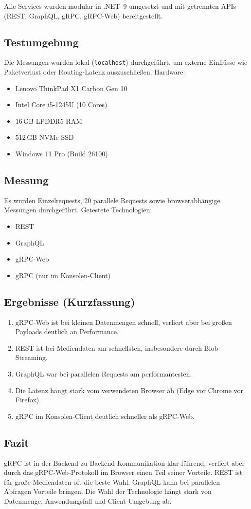Alle Services wurden modular in .NET~9 umgesetzt und mit getrennten APIs (REST, GraphQL, gRPC, gRPC-Web) bereitgestellt.

\subsection{Testumgebung}
Die Messungen wurden lokal (\texttt{localhost}) durchgeführt, um externe Einflüsse wie Paketverlust oder Routing-Latenz auszuschließen.
Hardware:
\begin{itemize}
	\item Lenovo ThinkPad X1 Carbon Gen 10
	\item Intel Core i5-1245U (10 Cores)
	\item 16\,GB LPDDR5 RAM
	\item 512\,GB NVMe SSD
	\item Windows 11 Pro (Build 26100)
\end{itemize}

\subsection{Messung}
Es wurden Einzelrequests, 20 parallele Requests sowie browserabhängige Messungen durchgeführt.  
Getestete Technologien:
\begin{itemize}
	\item REST
	\item GraphQL
	\item gRPC-Web
	\item gRPC (nur im Konsolen-Client)
\end{itemize}

\subsection{Ergebnisse (Kurzfassung)}
\begin{enumerate}
	\item gRPC-Web ist bei kleinen Datenmengen schnell, verliert aber bei großen Payloads deutlich an Performance.
	\item REST ist bei Mediendaten am schnellsten, insbesondere durch Blob-Streaming.
	\item GraphQL war bei parallelen Requests am performantesten.
	\item Die Latenz hängt stark vom verwendeten Browser ab (Edge vor Chrome vor Firefox).
	\item gRPC im Konsolen-Client deutlich schneller als gRPC-Web.
\end{enumerate}

\subsection{Fazit}
gRPC ist in der Backend-zu-Backend-Kommunikation klar führend, verliert aber durch das gRPC-Web-Protokoll im Browser einen Teil seiner Vorteile.
REST ist für große Mediendaten oft die beste Wahl.
GraphQL kann bei parallelen Abfragen Vorteile bringen.
Die Wahl der Technologie hängt stark von Datenmenge, Anwendungsfall und Client-Umgebung ab.

\chapterend


